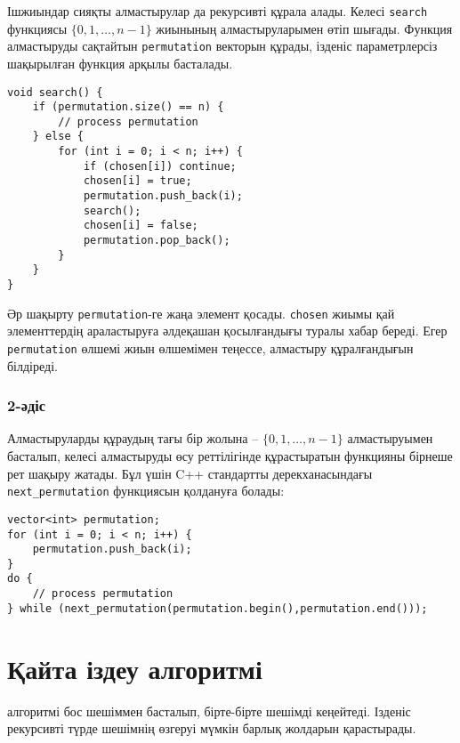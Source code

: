 Ішжиындар сияқты алмастырулар да рекурсивті құрала алады.
Келесі \texttt{search} функциясы $\{0,1,\ldots,n-1\}$ жиынының алмастыруларымен
өтіп шығады. Функция алмастыруды сақтайтын \texttt{permutation} векторын құрады,
ізденіс параметрлерсіз шақырылған функция арқылы басталады.

\begin{lstlisting}
void search() {
    if (permutation.size() == n) {
        // process permutation
    } else {
        for (int i = 0; i < n; i++) {
            if (chosen[i]) continue;
            chosen[i] = true;
            permutation.push_back(i);
            search();
            chosen[i] = false;
            permutation.pop_back();
        }
    }
}
\end{lstlisting}

Әр шақырту \texttt{permutation}-ге жаңа элемент қосады.
\texttt{chosen} жиымы қай элементтердің араластыруға әлдеқашан қосылғандығы туралы хабар береді.
Егер \texttt{permutation} өлшемі жиын өлшемімен теңессе, алмастыру құралғандығын білдіреді.

\subsubsection{2-әдіс}


Алмастыруларды құраудың тағы бір жолына -- 
$\{0,1,\ldots,n-1\}$ алмастыруымен басталып, 
келесі алмастыруды өсу реттілігінде құрастыратын функцияны бірнеше рет шақыру жатады.
Бұл үшін C++ стандартты дерекханасындағы \texttt{next\_permutation} 
функциясын қолдануға болады:

\begin{lstlisting}
vector<int> permutation;
for (int i = 0; i < n; i++) {
    permutation.push_back(i);
}
do {
    // process permutation 
} while (next_permutation(permutation.begin(),permutation.end()));
\end{lstlisting}

\section{Қайта іздеу алгоритмі}


 алгоритмі
бос шешіммен басталып, бірте-бірте шешімді кеңейтеді.
Ізденіс рекурсивті түрде шешімнің өзгеруі мүмкін барлық
жолдарын қарастырады.

